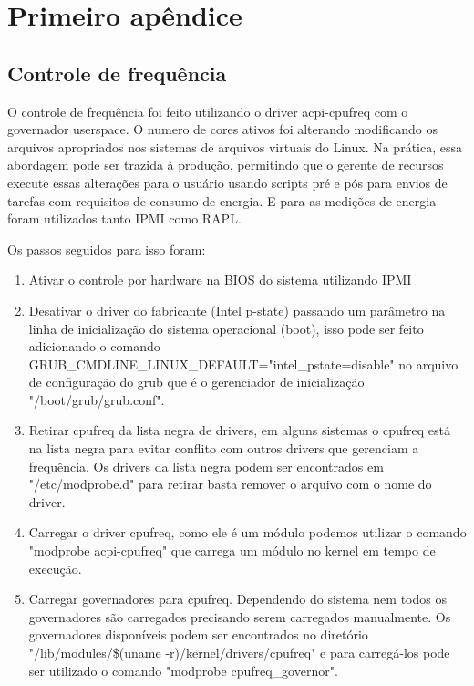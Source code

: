 \apendice
\chapter{Primeiro apêndice}

\section{Controle de frequência}

O controle de frequência foi feito utilizando o driver  acpi-cpufreq com o governador userspace. O numero de cores ativos foi alterando modificando os arquivos apropriados nos sistemas de arquivos virtuais do Linux. Na prática, essa abordagem pode ser trazida à produção, permitindo que o gerente de recursos execute essas alterações para o usuário usando scripts pré e pós para envios de tarefas com requisitos de consumo de energia. E para as medições de energia foram utilizados tanto IPMI como RAPL.

Os passos seguidos para isso foram:

\begin{enumerate}
	
	\item Ativar o controle por hardware na BIOS do sistema utilizando IPMI
	
	\item Desativar o driver do fabricante (Intel p-state) passando um parâmetro na linha de inicialização do sistema operacional (boot), isso pode ser feito adicionando o comando GRUB\_CMDLINE\_LINUX\_DEFAULT="intel\_pstate=disable"  no arquivo de configuração do grub que é o gerenciador de inicialização "/boot/grub/grub.conf".
	
	\item Retirar cpufreq da lista negra de drivers, em alguns sistemas o cpufreq está na lista negra para evitar conflito com outros drivers que gerenciam a frequência. Os drivers da lista negra podem ser encontrados em "/etc/modprobe.d"  para retirar basta remover o arquivo com o nome do driver.
	
	\item Carregar o driver cpufreq, como ele é um módulo podemos utilizar o comando "modprobe acpi-cpufreq" que carrega um módulo no kernel em tempo de execução.
	
	\item Carregar governadores para cpufreq. Dependendo do sistema nem todos os governadores são carregados precisando serem carregados manualmente. Os governadores disponíveis podem ser encontrados no diretório "/lib/modules/\$(uname -r)/kernel/drivers/cpufreq" e para carregá-los pode ser utilizado o comando "modprobe cpufreq\_governor".
	
\end{enumerate}

